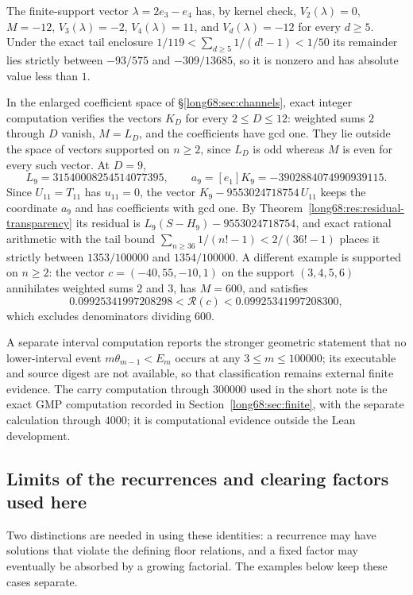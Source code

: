 \documentclass[11pt]{article}
\newcommand{\Ser}{S}
\newcommand{\chn}[2]{V_{#1}(#2)}
\newcommand{\Lc}{L}
\begin{document}
The finite-support vector $\lambda=2e_3-e_4$ has, by kernel check,
$\chn2\lambda=0$, $M=-12$, $\chn3\lambda=-2$,
$\chn4\lambda=11$, and $\chn d\lambda=-12$ for every $d\ge5$.  Under the
exact tail enclosure
$1/119<\sum_{d\ge5}1/(d!-1)<1/50$ its remainder lies
strictly between $-93/575$ and $-309/13685$, so it is nonzero and has
absolute value less than $1$.

In the enlarged coefficient space of \S\ref{long68:sec:channels}, exact
integer computation verifies the vectors $K_D$ for every $2\le D\le12$:
weighted sums $2$ through $D$ vanish, $M=\Lc_D$, and the
coefficients have gcd one.  They lie outside the space of vectors supported
on $n\ge2$, since $\Lc_D$ is odd whereas $M$ is even for every such vector.  At
$D=9$,
\[
 \Lc_9=31540008254514077395,\qquad a_9=[e_1]K_9=-3902884074990939115 .
\]
Since $U_{11}=T_{11}$ has $u_{11}=0$, the vector $K_9-9553024718754\,U_{11}$
keeps the coordinate $a_9$ and has coefficients with gcd one.  By
Theorem~\ref{long68:res:residual-transparency} its residual is
$\Lc_9(\Ser-H_9)-9553024718754$, and exact rational arithmetic with the tail
bound $\sum_{n\ge36}1/(n!-1)<2/(36!-1)$ places it strictly between
$1353/100000$ and $1354/100000$.  A different example is supported on
$n\ge2$: the vector $c=(-40,55,-10,1)$ on the support $(3,4,5,6)$ annihilates
weighted sums $2$ and $3$, has $M=600$, and satisfies
\[
 0.09925341997208298<\mathcal R(c)<0.09925341997208300 ,
\]
which excludes denominators dividing $600$.

A separate interval computation reports the stronger geometric statement that no
lower-interval event $m\theta_{m-1}<E_m$ occurs at any $3\le m\le100000$; its executable and source
digest are not available, so that classification remains external finite
evidence.  The carry computation through $300000$ used in the short note is the
exact GMP computation recorded in Section~\ref{long68:sec:finite}, with
the separate calculation through $4000$; it is computational evidence
outside the Lean development.

\subsection{Limits of the recurrences and clearing factors used here}\label{long68:sec:ext-nogo}

Two distinctions are needed in using these identities: a recurrence
may have solutions that violate the defining floor relations, and a
fixed factor may eventually be absorbed by a growing factorial. The
examples below keep these cases separate.
\end{document}
